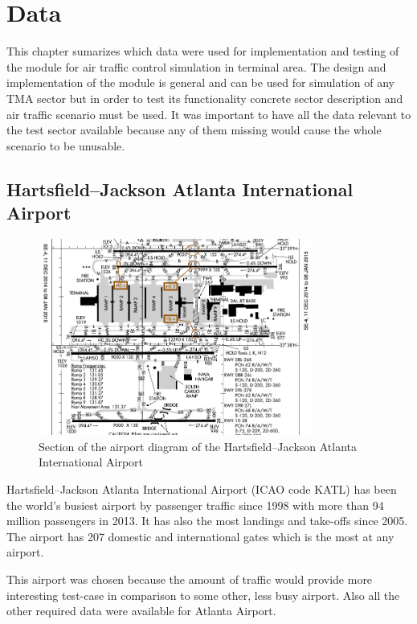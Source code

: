 \chapter{Data}

This chapter sumarizes which data were used for implementation and testing of the module for air traffic control simulation in terminal area. The design and implementation of the module is general and can be used for simulation of any TMA sector but in order to test its functionality concrete sector description and air traffic scenario must be used. It was important to have all the data relevant to the test sector available because any of them missing would cause the whole scenario to be unusable.

\section{Hartsfield–Jackson Atlanta International Airport}

\begin{figure}[h]
    \centering
    \includegraphics[width=0.8\textwidth]{figures/atlanta-diagram.pdf}
    \caption{Section of the airport diagram of the Hartsfield–Jackson Atlanta International Airport \cite{atlanta-diagram}}
    \label{fig:atlanta-diagram}
\end{figure}

Hartsfield–Jackson Atlanta International Airport (ICAO code KATL) has been the world's busiest airport by passenger traffic since 1998 with more than 94 million passengers in 2013. It has also the most landings and take-offs since 2005. The airport has 207 domestic and international gates which is the most at any airport. \cite{atlanta}

This airport was chosen because the amount of traffic would provide more interesting test-case in comparison to some other, less busy airport. Also all the other required data were available for Atlanta Airport.

